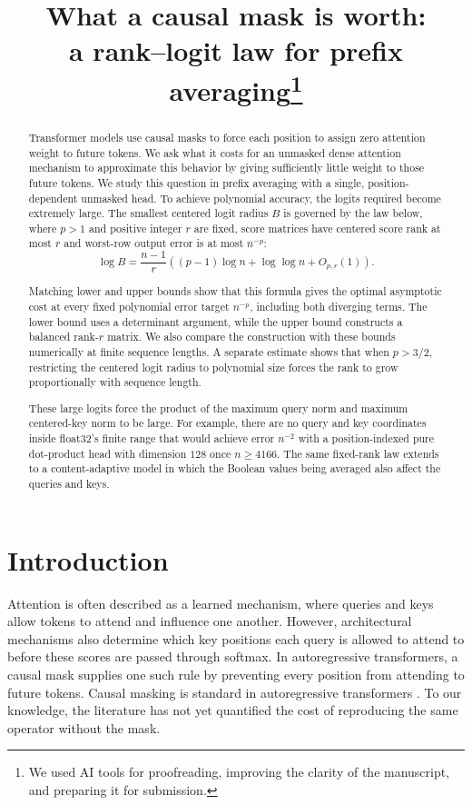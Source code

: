 \documentclass[10pt]{article} %
\title{What a causal mask is worth:\\
a rank--logit law for prefix averaging\thanks{We used AI tools for proofreading,
improving the clarity of the manuscript, and preparing it for submission.}}
\author{}
\theoremstyle{definition}
\begin{document}
\maketitle

\begin{abstract}
Transformer models use causal masks to force each position to assign zero
attention weight to future tokens. We ask what it costs for an unmasked dense
attention mechanism to approximate this behavior by giving sufficiently little
weight to those future tokens. We study this question in prefix averaging with
a single, position-dependent unmasked head. To achieve polynomial accuracy,
the logits required become extremely large. The smallest centered logit radius
\(B\) is governed by the law below, where \(p>1\) and positive integer \(r\)
are fixed, score matrices have centered score rank at most \(r\) and worst-row
output error is at most \(n^{-p}\):
\[
 \log B
 =\frac{n-1}{r}
 \left((p-1)\log n+\log\log n+O_{p,r}(1)\right).
\]

Matching lower and upper bounds show that this formula gives the optimal
asymptotic cost at every fixed polynomial error target \(n^{-p}\), including
both diverging terms. The lower bound uses a determinant argument, while the
upper bound constructs a balanced rank-\(r\) matrix. We also compare the
construction with these bounds numerically at finite sequence lengths. A
separate estimate shows that when \(p>3/2\), restricting the centered logit
radius to polynomial size forces the rank to grow proportionally with sequence
length.

These large logits force the product of the maximum query norm and maximum
centered-key norm to be large. For example, there are no query and key
coordinates inside float32's finite range that would achieve error \(n^{-2}\)
with a position-indexed pure dot-product head with dimension \(128\) once
\(n\ge4166\). The same fixed-rank law extends to a content-adaptive model in
which the Boolean values being averaged also affect the queries and keys.
\end{abstract}

\section{Introduction}

Attention is often described as a learned mechanism, where queries and keys
allow tokens to attend and influence one another. However, architectural
mechanisms also determine which key positions each query is allowed to attend
to before these scores are passed through softmax. In autoregressive
transformers, a causal mask supplies one such rule by preventing every
position from attending to future tokens. Causal masking is standard in
autoregressive transformers \citep{vaswani2017attention}. To our knowledge,
the literature has not yet quantified the cost of reproducing the same
operator without the mask.
\end{document}

